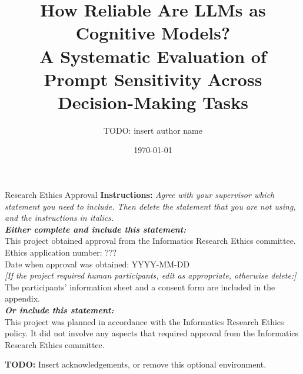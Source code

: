 \documentclass[logo,msc]{infthesis}           %
\begin{document}
\begin{preliminary}

\title{How Reliable Are LLMs as Cognitive Models?\\
\large A Systematic Evaluation of Prompt Sensitivity Across Decision-Making Tasks}

\author{TODO: insert author name}

\date{\today}


\maketitle

\newenvironment{ethics}
   {\begin{frontenv}{Research Ethics Approval}{\LARGE}}
   {\end{frontenv}\newpage}

\begin{ethics}
\textbf{Instructions:} \emph{Agree with your supervisor which
statement you need to include. Then delete the statement that you are not using,
and the instructions in italics.\\
\textbf{Either complete and include this statement:}}\\ %
%
This project obtained approval from the Informatics Research Ethics committee.\\
Ethics application number: ???\\
Date when approval was obtained: YYYY-MM-DD\\
%
\emph{[If the project required human participants, edit as appropriate, otherwise delete:]}\\ %
The participants' information sheet and a consent form are included in the appendix.\\
%
\textbf{\emph{Or include this statement:}}\\ %
This project was planned in accordance with the Informatics Research
Ethics policy. It did not involve any aspects that required approval
from the Informatics Research Ethics committee.

\standarddeclaration
\end{ethics}

\begin{acknowledgements}
\textbf{TODO:} Insert acknowledgements, or remove this optional environment.
\end{acknowledgements}

\tableofcontents
\end{preliminary}
\end{document}
